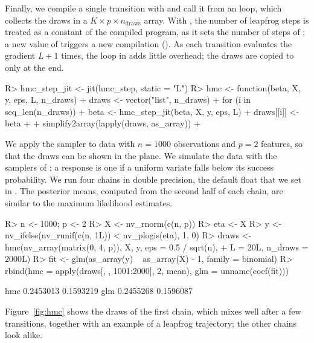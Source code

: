 \documentclass[article,shortnames]{jss}
\renewenvironment{CodeChunk}{\par\addvspace{0.6\baselineskip}\noindent\begin{minipage}{\linewidth}}{\end{minipage}\par\vspace{0.6\baselineskip}}
\begin{document}
Finally, we compile a single transition with  and call it from an  loop, which collects the draws in a $K \times p \times n_{\text{draws}}$ array.
With , the number of leapfrog steps is treated as a constant of the compiled program, as it sets the number of steps of ; a new value of  triggers a new compilation ().
As each transition evaluates the gradient $L + 1$ times, the loop in  adds little overhead; the draws are copied to  only at the end.

\begin{CodeChunk}
\begin{CodeInput}
R> hmc_step_jit <- jit(hmc_step, static = "L")
R> hmc <- function(beta, X, y, eps, L, n_draws) {
+    draws <- vector("list", n_draws)
+    for (i in seq_len(n_draws)) {
+      beta <- hmc_step_jit(beta, X, y, eps, L)
+      draws[[i]] <- beta
+    }
+    simplify2array(lapply(draws, as_array))
+  }
\end{CodeInput}
\end{CodeChunk}

We apply the sampler to data with $n = 1000$ observations and $p = 2$ features, so that the draws can be shown in the plane.
We simulate the data with the samplers of : a response is one if a uniform variate falls below its success probability.
We run four chains in double precision, the default float that we set in .
The posterior means, computed from the second half of each chain, are similar to the maximum likelihood estimates.

\begin{CodeChunk}
\begin{CodeInput}
R> n <- 1000; p <- 2
R> X <- nv_rnorm(c(n, p))
R> eta <- X %
R> y <- nv_ifelse(nv_runif(c(n, 1L)) < nv_plogis(eta), 1, 0)
R> draws <- hmc(nv_array(matrix(0, 4, p)), X, y, eps = 0.5 / sqrt(n),
+    L = 20L, n_draws = 2000L)
R> fit <- glm(as_array(y) ~ as_array(X) - 1, family = binomial)
R> rbind(hmc = apply(draws[, , 1001:2000], 2, mean), glm = unname(coef(fit)))
\end{CodeInput}
\begin{CodeOutput}
         [,1]      [,2]
hmc 0.2453013 0.1593219
glm 0.2455268 0.1596087
\end{CodeOutput}
\end{CodeChunk}

Figure~\ref{fig:hmc} shows the draws of the first chain, which mixes well after a few transitions, together with an example of a leapfrog trajectory; the other chains look alike.
\end{document}
